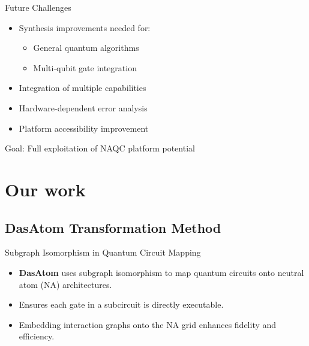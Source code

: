 \documentclass{beamer}
\begin{document}
\begin{frame}{Future Challenges}
    \begin{itemize}
        \item Synthesis improvements needed for:
        \begin{itemize}
            \item General quantum algorithms
            \item Multi-qubit gate integration
        \end{itemize}
        \item Integration of multiple capabilities
        \item Hardware-dependent error analysis
        \item Platform accessibility improvement
    \end{itemize}
    \vspace{1em}
    \centering
    Goal: Full exploitation of NAQC platform potential
\end{frame}

\section{Our work}

\subsection{DasAtom Transformation Method}

\begin{frame}{Subgraph Isomorphism in Quantum Circuit Mapping}
  \begin{itemize}
    \item \textbf{DasAtom} uses subgraph isomorphism to map quantum circuits onto neutral atom (NA) architectures.
    \item Ensures each gate in a subcircuit is directly executable.
    \item Embedding interaction graphs onto the NA grid enhances fidelity and efficiency.
  \end{itemize}

\end{frame}
\end{document}
